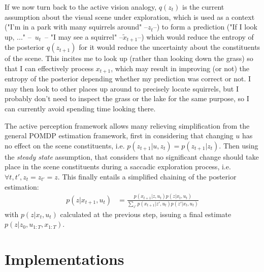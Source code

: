 \documentclass{article} %
\begin{document}
If we now turn back to the active vision analogy, $q(z_t)$ is the current assumption about the visual scene under exploration, which is used as a context ("I'm in a park with many squirrels around" --$z_t$--) to form a prediction ("If I look up, ..." --~$u_t$~-- "I may see a squirrel" --$\tilde{x}_{t+1}$--) which would reduce the entropy of the posterior $q(z_{t+1})$ for it would reduce the uncertainty about the constituents of the scene.  This incites me to look up (rather than looking down the grass) so that I can effectively process $x_{t+1}$, which may result in improving (or not) the entropy of the posterior depending whether my prediction was correct or not. I may then look to other places up around to precisely locate squirrels, but I probably don't need to inspect the grass or the lake for the same purpose, so I can currently avoid spending time looking there.   

The active perception framework allows many relieving simplification from the general POMDP estimation framework, first in considering that changing $u$ has no effect on the scene constituents, i.e. $p(z_{t+1}|u,z_t) = p(z_{t+1}|z_t)$. Then using the \emph{steady state} assumption, that considers that no significant change should take place in the scene constituents during a saccadic exploration process, i.e. $\forall t, t', z_{t} = z_{t'} = z$. This finally entails a simplified chaining of the posterior estimation:
 	\begin{align*}
 	p(z|x_{t+1},u_t) &= \frac{p(x_{t+1}|z,u_t) p(z|x_t, u_t)}{\sum_{z'}p(x_{t+1}|z',u_t) p(z'|x_t, u_t)}
 	\end{align*}
with $p(z|x_t, u_t)$ calculated at the previous step, issuing a final estimate $p(z|z_0, u_{1:T}, x_{1:T})$.  


\section{Implementations}
\end{document}
